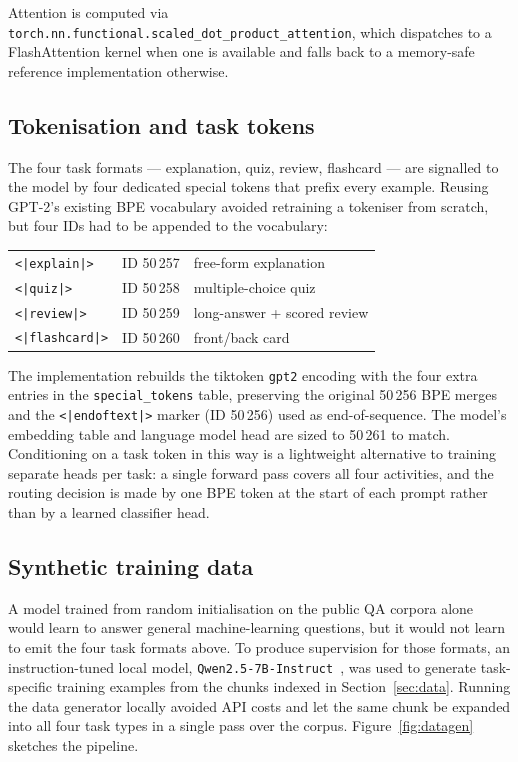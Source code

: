 Attention is computed via \texttt{torch.nn.functional.scaled\_dot\_product\_attention}, which
dispatches to a FlashAttention kernel when one is available and falls back to a memory-safe
reference implementation otherwise.

\subsection{Tokenisation and task tokens}
\label{sec:tokenizer}

The four task formats --- explanation, quiz, review, flashcard --- are signalled to the model
by four dedicated special tokens that prefix every example. Reusing GPT-2's existing BPE
vocabulary avoided retraining a tokeniser from scratch, but four IDs had to be appended to
the vocabulary:

\begin{center}\small
\begin{tabular}{lll}
\toprule
\texttt{<|explain|>} & ID 50\,257 & free-form explanation \\
\texttt{<|quiz|>}    & ID 50\,258 & multiple-choice quiz \\
\texttt{<|review|>}  & ID 50\,259 & long-answer + scored review \\
\texttt{<|flashcard|>} & ID 50\,260 & front/back card \\
\bottomrule
\end{tabular}
\end{center}

The implementation rebuilds the tiktoken \texttt{gpt2} encoding with the four extra entries
in the \texttt{special\_tokens} table, preserving the original 50\,256 BPE merges and
the \texttt{<|endoftext|>} marker (ID 50\,256) used as end-of-sequence. The model's embedding
table and language model head are sized to 50\,261 to match. Conditioning on a task token in
this way is a lightweight alternative to training separate heads per task: a single forward
pass covers all four activities, and the routing decision is made by one BPE token at the
start of each prompt rather than by a learned classifier head.

\subsection{Synthetic training data}
\label{sec:training_data}

A model trained from random initialisation on the public QA corpora alone would learn to
answer general machine-learning questions, but it would not learn to emit the four task
formats above. To produce supervision for those formats, an instruction-tuned local model,
\texttt{Qwen2.5-7B-Instruct}~\cite{yang2024qwen25}, was used to generate task-specific
training examples from the chunks indexed in Section~\ref{sec:data}. Running the data
generator locally avoided API costs and let the same chunk be expanded into all four task
types in a single pass over the corpus. Figure~\ref{fig:datagen} sketches the pipeline.

